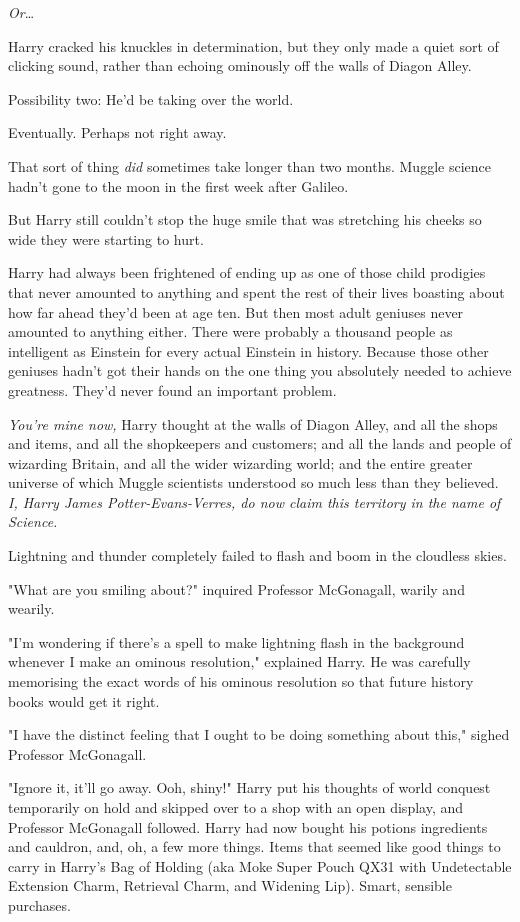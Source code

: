 \emph{Or}{\ldots}

Harry cracked his knuckles in determination, but they only made a quiet sort of
clicking sound, rather than echoing ominously off the walls of Diagon Alley.

Possibility two: He'd be taking over the world.

Eventually. Perhaps not right away.

That sort of thing \emph{did} sometimes take longer than two months. Muggle
science hadn't gone to the moon in the first week after Galileo.

But Harry still couldn't stop the huge smile that was stretching his cheeks so
wide they were starting to hurt.

Harry had always been frightened of ending up as one of those child prodigies
that never amounted to anything and spent the rest of their lives boasting
about how far ahead they'd been at age ten. But then most adult geniuses never
amounted to anything either. There were probably a thousand people as
intelligent as Einstein for every actual Einstein in history. Because those
other geniuses hadn't got their hands on the one thing you absolutely needed
to achieve greatness. They'd never found an important problem.

\emph{You're mine now,} Harry thought at the walls of Diagon Alley, and all the
shops and items, and all the shopkeepers and customers; and all the lands and
people of wizarding Britain, and all the wider wizarding world; and the entire
greater universe of which Muggle scientists understood so much less than they
believed. \emph{I, Harry James Potter-Evans-Verres, do now claim this territory
in the name of Science.}

Lightning and thunder completely failed to flash and boom in the cloudless
skies.

"What are you smiling about?" inquired Professor McGonagall, warily and wearily.

"I'm wondering if there's a spell to make lightning flash in the background
whenever I make an ominous resolution," explained Harry. He was carefully
memorising the exact words of his ominous resolution so that future history
books would get it right.

"I have the distinct feeling that I ought to be doing something about this,"
sighed Professor McGonagall.

"Ignore it, it'll go away. Ooh, shiny!" Harry put his thoughts of world
conquest temporarily on hold and skipped over to a shop with an open display,
and Professor McGonagall followed.
\later
Harry had now bought his potions ingredients and cauldron, and, oh, a few more
things. Items that seemed like good things to carry in Harry's Bag of Holding
(aka Moke Super Pouch QX31 with Undetectable Extension Charm, Retrieval Charm,
and Widening Lip). Smart, sensible purchases.

